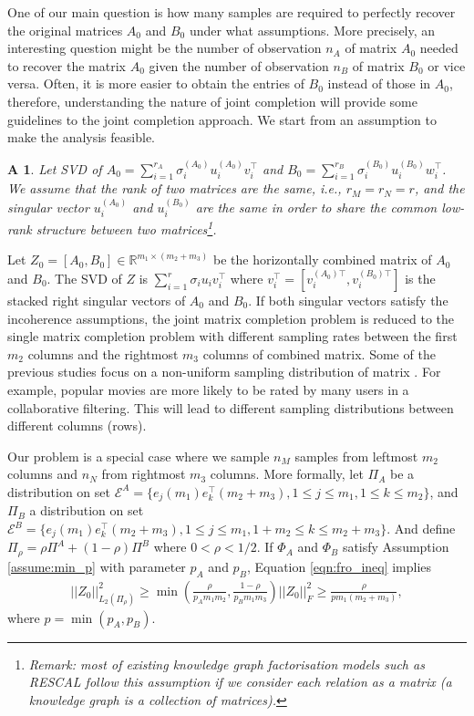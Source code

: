 \documentclass{article} %
\newtheorem{assumption}{A}
\newcommand\mc{\mathcal} %
\begin{document}
One of our main question is how many samples are required to perfectly recover the original matrices $A_0$ and $B_0$ under what assumptions. More precisely, an interesting question might be the number of observation $n_A$ of matrix $A_0$ needed to recover the matrix $A_0$ given the number of observation $n_B$ of matrix $B_0$ or vice versa. Often, it is more easier to obtain the entries of $B_0$ instead of those in $A_0$, therefore, understanding the nature of joint completion will provide some guidelines to the joint completion approach. We start from an assumption to make the analysis feasible.

\begin{assumption}\label{assume:share}
Let SVD of $A_0 = \sum_{i=1}^{r_A} \sigma_i^{(A_0)} u_i^{(A_0)} v_i^\top$ and $B_0 = \sum_{i=1}^{r_B} \sigma_i^{(B_0)} u_i^{(B_0)} w_i^\top$. We assume that the rank of two matrices are the same, i.e., $r_M = r_N = r$, and the singular vector $u_i^{(A_0)}$ and $u_i^{(B_0)}$ are the same in order to share the common low-rank structure between two matrices\footnote{Remark: most of existing knowledge graph factorisation models such as RESCAL follow this assumption if we consider each relation as a matrix (a knowledge graph is a collection of matrices).}.
\end{assumption}

Let $Z_0 = [A_0, B_0] \in \mathbb{R}^{m_1 \times (m_2+m_3)}$ be the horizontally combined matrix of $A_0$ and $B_0$. The SVD of $Z$ is $\sum_{i=1}^{r}\sigma_i u_i v_i^\top$ where $v_i^\top = [v_i^{(A_0)\top}, v_i^{(B_0)\top}]$ is the stacked right singular vectors of $A_0$ and $B_0$. If both singular vectors satisfy the incoherence assumptions, the joint matrix completion problem is reduced to the single matrix completion problem with different sampling rates between the first $m_2$ columns and the rightmost $m_3$ columns of combined matrix. Some of the previous studies focus on a non-uniform sampling distribution of matrix \cite{foygel2011learning,lounici2011optimal,negahban2012restricted,klopp2014noisy}. For example, popular movies are more likely to be rated by many users in a collaborative filtering. This will lead to different sampling distributions between different columns (rows). 

Our problem is a special case where we sample $n_M$ samples from leftmost $m_2$ columns and $n_N$ from rightmost $m_3$ columns. More formally, let $\Pi_A$ be a distribution on set $\mc{E}^{A} = \{e_j(m_1)e_k^\top(m_2+m_3), 1\leq j \leq m_1, 1\leq k \leq m_2\}$, and $\Pi_{B}$ a distribution on set $\mc{E}^{B} = \{e_j(m_1)e_k^\top(m_2+m_3), 1\leq j \leq m_1, 1+m_2\leq k \leq m_2+m_3\}$. And define $\Pi_\rho = \rho \Pi^{A} + (1-\rho)\Pi^{B}$ where $0 < \rho < 1/2$. If $\Phi_A$ and $\Phi_B$ satisfy Assumption \ref{assume:min_p} with parameter $p_A$ and $p_B$, Equation \ref{eqn:fro_ineq} implies
\begin{align}
||Z_0||_{L_2(\Pi_\rho)}^2 \geq \min(\frac{\rho}{p_Am_1m_2},\frac{1-\rho}{p_Bm_1m_3})||Z_0||_F^2 \geq \frac{\rho}{pm_1(m_2+m_3)},
\end{align}
where $p = \min(p_A, p_B)$.
\end{document}
